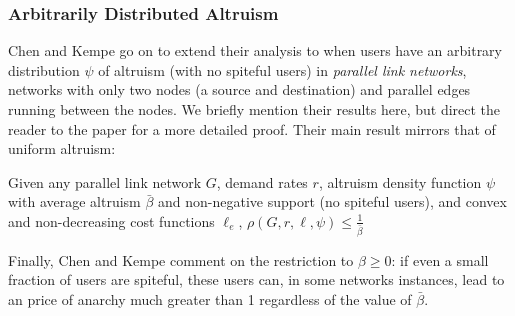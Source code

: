 \subsubsection{Arbitrarily Distributed Altruism}
Chen and Kempe go on to extend their analysis to when users have an arbitrary distribution $\psi$ of altruism (with no spiteful users) in \emph{parallel link networks}, networks with only two nodes (a source and destination) and parallel edges running between the nodes. 
We briefly mention their results here, but direct the reader to the paper for a more detailed proof.
Their main result mirrors that of uniform altruism:
\begin{theorem}
    Given any parallel link network $G$, demand rates $r$, altruism density function $\psi$ with average altruism $\bar{\beta}$ and non-negative support (no spiteful users), and convex and non-decreasing cost functions $\ell_e$,
   $\rho(G,r,\ell,\psi) \le \frac{1}{\bar{\beta}}$
\end{theorem}
%
Finally, Chen and Kempe comment on the restriction to $\beta \ge 0$: if even a small fraction of users are spiteful, these users can, in some networks instances, lead to an price of anarchy much greater than 1 regardless of the value of $\bar{\beta}$.
